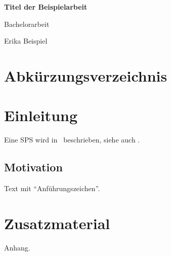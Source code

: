 \documentclass[a4paper,12pt,twoside]{scrreprt}
\begin{document}
\begin{titlepage}
  \centering
  \vspace*{3cm}
  {\LARGE\bfseries Titel der Beispielarbeit\par}
  \vspace{1cm}
  {\large Bachelorarbeit\par}
  \vfill
  {\large Erika Beispiel\par}
\end{titlepage}

\tableofcontents
\clearpage
{}
{}
\listoffigures

\chapter*{Abkürzungsverzeichnis}
\begin{acronym}[SPS]
\end{acronym}

\chapter{Einleitung}
Eine \ac{SPS} wird in~\parencite{muster2020} beschrieben, siehe auch \textcite{beispiel2021}.

\section{Motivation}
Text mit \enquote{Anführungszeichen}.

\appendix
\chapter{Zusatzmaterial}
Anhang.

\clearpage
{}
{}
\printbibliography
\end{document}
